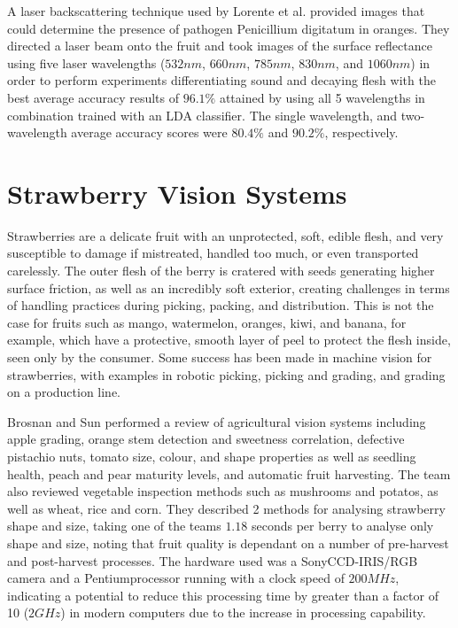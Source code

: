 \documentclass[fleqn,twoside,12pt]{report}
\begin{document}
A laser backscattering technique used by Lorente et al.\cite{lorente} provided images that could determine the presence of pathogen Penicillium digitatum in oranges. They directed a laser beam onto the fruit and took images of the surface reflectance using five laser wavelengths ($532nm$, $660nm$, $785nm$, $830nm$, and $1060nm$) in order to perform experiments differentiating sound and decaying flesh with the best average accuracy results of $96.1\%$ attained by using all 5 wavelengths in combination trained with an LDA classifier. The single wavelength, and two-wavelength average accuracy scores were $80.4\%$ and $90.2\%$, respectively.





\section{Strawberry Vision Systems}

Strawberries are a delicate fruit with an unprotected, soft, edible flesh, and very susceptible to damage if mistreated, handled too much, or even transported carelessly. The outer flesh of the berry is cratered with seeds generating higher surface friction, as well as an incredibly soft exterior, creating challenges in terms of handling practices during picking, packing, and distribution. This is not the case for fruits such as mango, watermelon, oranges, kiwi, and banana, for example, which have a protective, smooth layer of peel to protect the flesh inside, seen only by the consumer. Some success has been made in machine vision for strawberries, with examples in robotic picking, picking and grading, and grading on a production line. 

Brosnan and Sun \cite{brosnan} performed a review of agricultural vision systems including apple grading, orange stem detection and sweetness correlation, defective pistachio nuts, tomato size, colour, and shape properties as well as seedling health, peach and pear maturity levels, and automatic fruit harvesting. The team also reviewed vegetable inspection methods such as mushrooms and potatos, as well as wheat, rice and corn. They described 2 methods for analysing strawberry shape and size, taking one of the teams $1.18$ seconds per berry to analyse only shape and size, noting that fruit quality is dependant on a number of pre-harvest and post-harvest processes. The hardware used was a Sony\textregistered CCD-IRIS/RGB camera and a Pentium\textregistered processor running with a clock speed of $200MHz$, indicating a potential to reduce this processing time by greater than a factor of 10 ($2GHz$) in modern computers due to the increase in processing capability.
\end{document}
